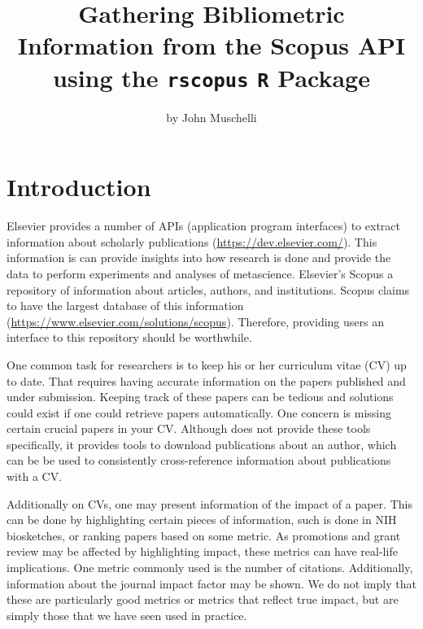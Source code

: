 \title{Gathering Bibliometric Information from the Scopus API using the
\texttt{rscopus} \texttt{R} Package}
\author{by John Muschelli}

\maketitle



\hypertarget{introduction}{%
\section{Introduction}\label{introduction}}

Elsevier provides a number of APIs (application program interfaces) to
extract information about scholarly publications
(\url{https://dev.elsevier.com/}). This information is can provide
insights into how research is done and provide the data to perform
experiments and analyses of metascience. Elsevier's Scopus a repository
of information about articles, authors, and institutions. Scopus claims
to have the largest database of this information
(\url{https://www.elsevier.com/solutions/scopus}). Therefore, providing
users an interface to this repository should be worthwhile.

One common task for researchers is to keep his or her curriculum vitae
(CV) up to date. That requires having accurate information on the papers
published and under submission. Keeping track of these papers can be
tedious and solutions could exist if one could retrieve papers
automatically. One concern is missing certain crucial papers in your CV.
Although  does not provide these tools specifically, it
provides tools to download publications about an author, which can be be
used to consistently cross-reference information about publications with
a CV.

Additionally on CVs, one may present information of the impact of a
paper. This can be done by highlighting certain pieces of information,
such is done in NIH biosketches, or ranking papers based on some metric.
As promotions and grant review may be affected by highlighting impact,
these metrics can have real-life implications. One metric commonly used
is the number of citations. Additionally, information about the journal
impact factor may be shown. We do not imply that these are particularly
good metrics or metrics that reflect true impact, but are simply those
that we have seen used in practice.\\


